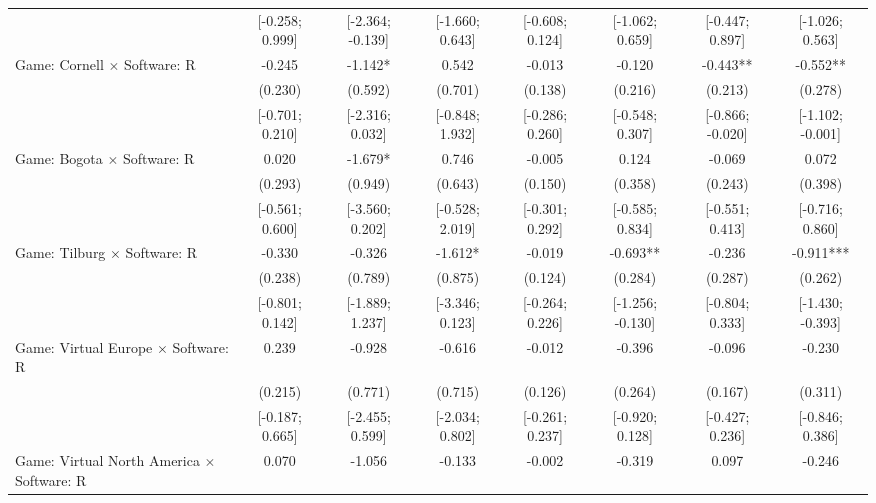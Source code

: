 \begin{tabular}{l*{7}{c}}
                    &[-0.258; 0.999]   &[-2.364; -0.139]   &[-1.660; 0.643]   &[-0.608; 0.124]   &[-1.062; 0.659]   &[-0.447; 0.897]   &[-1.026; 0.563]   \\
Game: Cornell $\times$ Software: R&      -0.245   &      -1.142*  &       0.542   &      -0.013   &      -0.120   &      -0.443** &      -0.552** \\
                    &     (0.230)   &     (0.592)   &     (0.701)   &     (0.138)   &     (0.216)   &     (0.213)   &     (0.278)   \\
                    &[-0.701; 0.210]   &[-2.316; 0.032]   &[-0.848; 1.932]   &[-0.286; 0.260]   &[-0.548; 0.307]   &[-0.866; -0.020]   &[-1.102; -0.001]   \\
Game: Bogota $\times$ Software: R&       0.020   &      -1.679*  &       0.746   &      -0.005   &       0.124   &      -0.069   &       0.072   \\
                    &     (0.293)   &     (0.949)   &     (0.643)   &     (0.150)   &     (0.358)   &     (0.243)   &     (0.398)   \\
                    &[-0.561; 0.600]   &[-3.560; 0.202]   &[-0.528; 2.019]   &[-0.301; 0.292]   &[-0.585; 0.834]   &[-0.551; 0.413]   &[-0.716; 0.860]   \\
Game: Tilburg $\times$ Software: R&      -0.330   &      -0.326   &      -1.612*  &      -0.019   &      -0.693** &      -0.236   &      -0.911***\\
                    &     (0.238)   &     (0.789)   &     (0.875)   &     (0.124)   &     (0.284)   &     (0.287)   &     (0.262)   \\
                    &[-0.801; 0.142]   &[-1.889; 1.237]   &[-3.346; 0.123]   &[-0.264; 0.226]   &[-1.256; -0.130]   &[-0.804; 0.333]   &[-1.430; -0.393]   \\
Game: Virtual Europe $\times$ Software: R&       0.239   &      -0.928   &      -0.616   &      -0.012   &      -0.396   &      -0.096   &      -0.230   \\
                    &     (0.215)   &     (0.771)   &     (0.715)   &     (0.126)   &     (0.264)   &     (0.167)   &     (0.311)   \\
                    &[-0.187; 0.665]   &[-2.455; 0.599]   &[-2.034; 0.802]   &[-0.261; 0.237]   &[-0.920; 0.128]   &[-0.427; 0.236]   &[-0.846; 0.386]   \\
Game: Virtual North America $\times$ Software: R&       0.070   &      -1.056   &      -0.133   &      -0.002   &      -0.319   &       0.097   &      -0.246   \\

\end{tabular}
